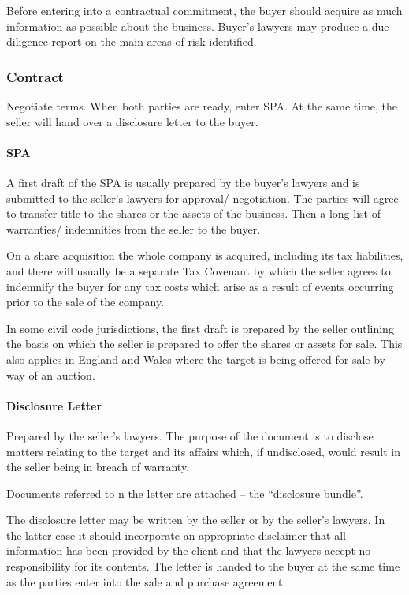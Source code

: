 \documentclass[
]{article}
\begin{document}
Before entering into a contractual commitment, the buyer should acquire
as much information as possible about the business. Buyer's lawyers may
produce a due diligence report on the main areas of risk identified.

\hypertarget{contract}{%
\subsubsection{Contract}\label{contract}}

Negotiate terms. When both parties are ready, enter SPA. At the same
time, the seller will hand over a disclosure letter to the buyer.

\hypertarget{spa}{%
\paragraph{SPA}\label{spa}}

A first draft of the SPA is usually prepared by the buyer's lawyers and
is submitted to the seller's lawyers for approval/ negotiation. The
parties will agree to transfer title to the shares or the assets of the
business. Then a long list of warranties/ indemnities from the seller to
the buyer.

On a share acquisition the whole company is acquired, including its tax
liabilities, and there will usually be a separate Tax Covenant by which
the seller agrees to indemnify the buyer for any tax costs which arise
as a result of events occurring prior to the sale of the company.

In some civil code jurisdictions, the first draft is prepared by the
seller outlining the basis on which the seller is prepared to offer the
shares or assets for sale. This also applies in England and Wales where
the target is being offered for sale by way of an auction.

\hypertarget{disclosure-letter}{%
\paragraph{Disclosure Letter}\label{disclosure-letter}}

Prepared by the seller's lawyers. The purpose of the document is to
disclose matters relating to the target and its affairs which, if
undisclosed, would result in the seller being in breach of warranty.

Documents referred to n the letter are attached -- the ``disclosure
bundle''.

The disclosure letter may be written by the seller or by the seller's
lawyers. In the latter case it should incorporate an appropriate
disclaimer that all information has been provided by the client and that
the lawyers accept no responsibility for its contents. The letter is
handed to the buyer at the same time as the parties enter into the sale
and purchase agreement.
\end{document}
